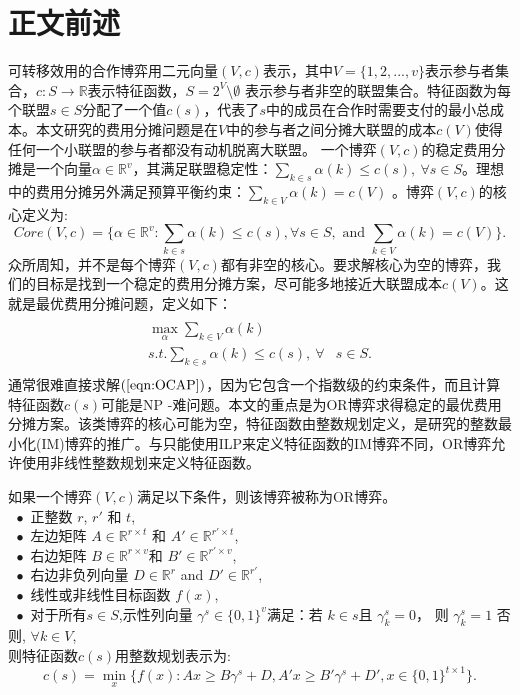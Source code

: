 \documentclass[UTF8]{article}
\newcommand{\R}{\mathbb{R}}
\begin{document}
\section{正文前述}\label{sec:definition}
可转移效用的合作博弈用二元向量$(V,c)$表示，其中$V = \{1,2,...,v\}$表示参与者集合，$c:S \rightarrow \mathbb{R}$表示特征函数，$S= 2^V \setminus \emptyset$ 表示参与者非空的联盟集合。特征函数为每个联盟$s\in S$分配了一个值$c(s)$，代表了$s$中的成员在合作时需要支付的最小总成本。本文研究的费用分摊问题是在$V$中的参与者之间分摊大联盟的成本$c(V)$使得任何一个小联盟的参与者都没有动机脱离大联盟。
一个博弈$(V,c)$的稳定费用分摊是一个向量$\alpha \in \R^{v}$，其满足联盟稳定性：$\sum_{k \in s} \alpha(k) \leq c(s),~ \forall s \in S$。理想中的费用分摊另外满足预算平衡约束：$\sum_{k \in V} \alpha(k) = c( V)$ 。博弈$(V,c)$的核心定义为:
\begin {equation*} \label{eqn:budgetbalance}
Core(V,c)=\{\alpha \in \R^{v}:\sum_{k \in s} \alpha(k) \leq c(s),\forall s \in S, \mbox{ and } \sum_{k \in V} \alpha(k) = c( V)\}.
\end {equation*}
众所周知，并不是每个博弈$(V,c)$都有非空的核心。要求解核心为空的博弈，我们的目标是找到一个稳定的费用分摊方案，尽可能多地接近大联盟成本$c(V)$。这就是最优费用分摊问题，定义如下：
\begin{eqnarray}\label{eqn:OCAP}
\begin{aligned}
\begin{split}
\max_{\alpha} \sum_{k \in V} \alpha(k)&\\
s.t. \sum_{k \in s} \alpha(k) \leq  c(s),~ \forall &s \in S.
\end{split}
\end{aligned}
\end{eqnarray}
通常很难直接求解$(\ref{eqn:OCAP})$，因为它包含一个指数级的约束条件，而且计算特征函数$c(s)$可能是NP -难问题。本文的重点是为OR博弈求得稳定的最优费用分摊方案。该类博弈的核心可能为空，特征函数由整数规划定义，是\cite{Caprara2010LPB}研究的整数最小化(IM)博弈的推广。与只能使用ILP来定义特征函数的IM博弈不同，OR博弈允许使用非线性整数规划来定义特征函数。

\begin{definition}\label{def2}
如果一个博弈$(V,c)$满足以下条件，则该博弈被称为OR博弈。\\
$~~\bullet$
正整数 $r$, $r'$ 和 $t$,\\
$~~\bullet$ 左边矩阵 $A \in \R^{r \times t}$ 和 $A' \in \R^{r' \times t}$,\\
$~~\bullet$ 右边矩阵 $B \in \R^{r \times v}$和 $B' \in \R^{r' \times v}$,\\
$~~\bullet$ 右边非负列向量 $D \in \R^{r}$ and $D' \in \R^{r'}$,\\
$~~\bullet$ 线性或非线性目标函数 $f(x)$,\\
$~~\bullet$ 对于所有$s \in S$,示性列向量 $\gamma^s \in \{0,1\}^v$满足：若 $k \in s$且 $\gamma_k^s=0$， 则 $\gamma_k^s=1$ 否则, $\forall k \in V$,\\
则特征函数$c(s)$用整数规划表示为:
\begin{equation}\label{eqn:orgc}
c(s) = \min_{x} \big\{ f(x):Ax \geq B\gamma^s + D, A'x \geq B'\gamma^s + D', x \in \{0,1\}^{t \times 1} \big\}.
\end{equation}
\end{definition}
\end{document}
